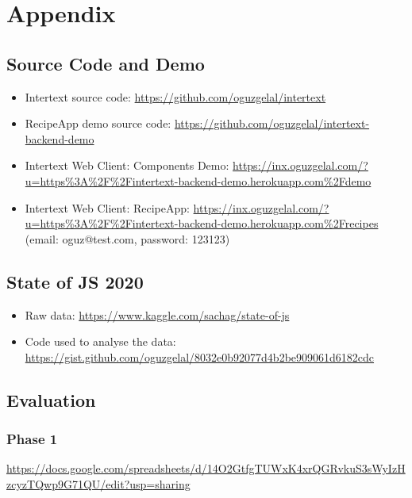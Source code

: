 \chapter{Appendix} \label{App:AppendixA}

\section{Source Code and Demo}

\begin{itemize}
    \item Intertext source code: \url{https://github.com/oguzgelal/intertext}
    
    \item RecipeApp demo source code: \url{https://github.com/oguzgelal/intertext-backend-demo}
    
    \item Intertext Web Client: Components Demo: \url{https://inx.oguzgelal.com/?u=https\%3A\%2F\%2Fintertext-backend-demo.herokuapp.com\%2Fdemo}
    
    \item Intertext Web Client: RecipeApp: \url{https://inx.oguzgelal.com/?u=https\%3A\%2F\%2Fintertext-backend-demo.herokuapp.com\%2Frecipes} (email: oguz@test.com, password: 123123)
\end{itemize}

\section{State of JS 2020}

\begin{itemize}
    \item Raw data: \url{https://www.kaggle.com/sachag/state-of-js}
    \item Code used to analyse the data: \url{https://gist.github.com/oguzgelal/8032e0b92077d4b2be909061d6182cdc}
\end{itemize}


\section{Evaluation}

\subsection{Phase 1}

\url{https://docs.google.com/spreadsheets/d/14O2GtfgTUWxK4xrQGRvkuS3sWyIzHzcyzTQwp9G71QU/edit?usp=sharing}

